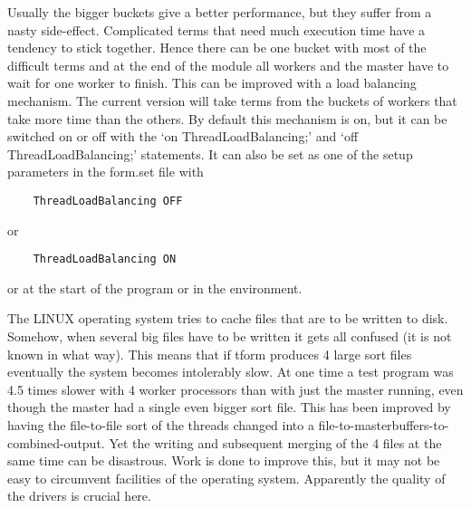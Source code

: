 Usually the bigger buckets give a better performance, but they suffer from 
a nasty side-effect. Complicated terms that need much execution time have a 
tendency to stick together. Hence there can be one bucket with most of the 
difficult terms and at the end of the module all workers and the master 
have to wait for one worker to finish. This can be improved with a 
load balancing mechanism. The current version will 
take terms from the buckets of workers that take more time than the others. 
By default this mechanism is on, but it can be switched on or off with the 
`on ThreadLoadBalancing;' and `off 
ThreadLoadBalancing;' statements. It can also be set as one of the setup 
parameters in the form.set file with
\begin{verbatim}
    ThreadLoadBalancing OFF
\end{verbatim}
or
\begin{verbatim}
    ThreadLoadBalancing ON
\end{verbatim}
or at the start of the program or in the environment.

The LINUX operating system tries to cache files 
that are to be written to disk. Somehow, when several big files have to be 
written it gets all confused (it is not known in what way). This means that 
if tform produces 4 large sort files eventually the system 
becomes intolerably slow. At one time a test program was 4.5 times slower 
with 4 worker processors than with just the master running, even though the 
master had a single even bigger sort file. This has been improved by having 
the file-to-file sort of the threads changed into a 
file-to-masterbuffers-to-combined-output. Yet the writing and subsequent 
merging of the 4 files at the same time can be disastrous. Work is done to 
improve this, but it may not be easy to circumvent facilities of the 
operating system. Apparently the quality of the drivers is crucial here. 

